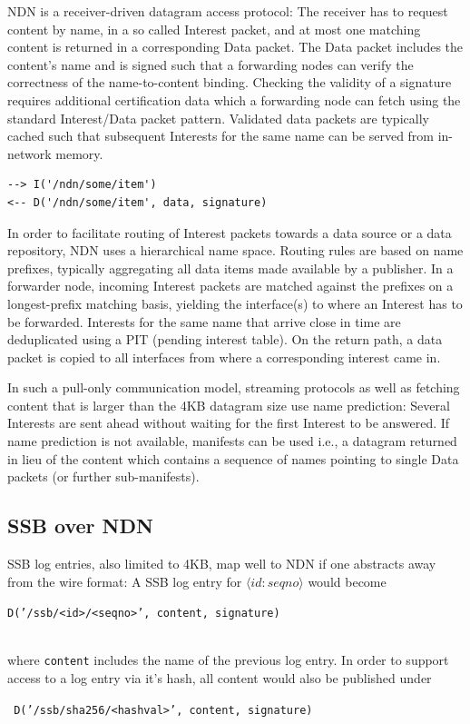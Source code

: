\documentclass[sigconf]{acmart}
\begin{document}
NDN is a receiver-driven datagram access protocol: The receiver has to
request content by name, in a so called Interest packet, and at most
one matching content is returned in a corresponding Data packet. The
Data packet includes the content's name and is signed such that a
forwarding nodes can verify the correctness of the name-to-content
binding. Checking the validity of a signature requires additional
certification data which a forwarding node can fetch using the
standard Interest/Data packet pattern. Validated data packets are
typically cached such that subsequent Interests for the same name can
be served from in-network memory.

\begin{verbatim}
--> I('/ndn/some/item')
<-- D('/ndn/some/item', data, signature)
\end{verbatim}

In order to facilitate routing of Interest packets towards a data
source or a data repository, NDN uses a hierarchical name
space. Routing rules are based on name prefixes, typically aggregating
all data items made available by a publisher. In a forwarder node,
incoming Interest packets are matched against the prefixes on a
longest-prefix matching basis, yielding the interface(s) to where an
Interest has to be forwarded. Interests for the same name that arrive
close in time are deduplicated using a PIT (pending interest
table). On the return path, a data packet is copied to all interfaces
from where a corresponding interest came in.

In such a pull-only communication model, streaming protocols as well
as fetching content that is larger than the 4KB datagram size use name
prediction: Several Interests are sent ahead without waiting for the
first Interest to be answered. If name prediction is not available,
manifests can be used i.e., a datagram returned in lieu of the content
which contains a sequence of names pointing to single Data packets (or
further sub-manifests).

\subsection{SSB over NDN}

SSB log entries, also limited to 4KB, map well to NDN if one
abstracts away from the wire format: A SSB
log entry for \mbox{$\langle id:seqno\rangle$} would become\\
  \centerline{\tt D('/ssb/<id>/<seqno>', content, signature)} \\
where {\tt content} includes the name of the previous log entry.
In order to support access to a log entry via it's hash, all content
would also be published under\\
\centerline{\tt
  D('/ssb/sha256/<hashval>', content, signature)}
\end{document}
